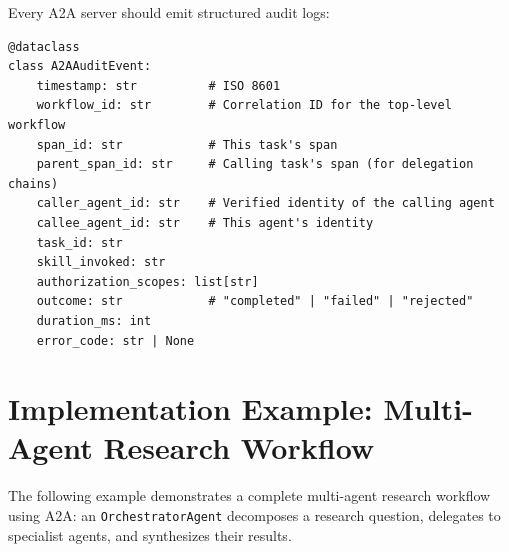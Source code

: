 Every A2A server should emit structured audit logs:

\begin{lstlisting}[style=pythonstyle]
@dataclass
class A2AAuditEvent:
    timestamp: str          # ISO 8601
    workflow_id: str        # Correlation ID for the top-level workflow
    span_id: str            # This task's span
    parent_span_id: str     # Calling task's span (for delegation chains)
    caller_agent_id: str    # Verified identity of the calling agent
    callee_agent_id: str    # This agent's identity
    task_id: str
    skill_invoked: str
    authorization_scopes: list[str]
    outcome: str            # "completed" | "failed" | "rejected"
    duration_ms: int
    error_code: str | None
\end{lstlisting}

\section{Implementation Example: Multi-Agent Research Workflow}
\label{sec:a2a:implementation}

The following example demonstrates a complete multi-agent research workflow using A2A: an \texttt{OrchestratorAgent} decomposes a research question, delegates to specialist agents, and synthesizes their results.

